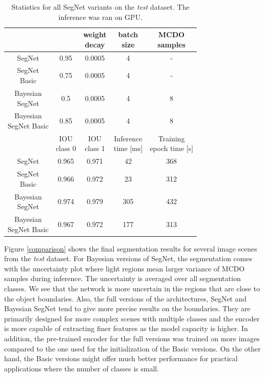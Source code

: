 \renewcommand{\arraystretch}{1.1}
\begin{table}[h]
	\centering	
	\begin{tabular}{|c|c|c|c|c|}
		\hline
		\thead{Architecture} & \thead{base\_lr} & \thead{weight \\ decay} & \thead{batch \\ size} & \thead{MCDO \\ samples}\\		
		\hline
		SegNet & 0.95 & 0.0005 & 4 & - \\
		\hline
		\makecell{SegNet \\ Basic} & 0.75 & 0.0005 & 4 & - \\
		\hline
		\makecell{Bayesian \\ SegNet} & 0.5 & 0.0005 & 4 & 8 \\	
		\hline
		\makecell{Bayesian \\ SegNet Basic} & 0.85 & 0.0005 & 4 & 8 \\
		\hline
		& \thead{IOU \\ class 0} & \thead{IOU \\ class 1} & \thead{Inference \\ time [ms] } & \thead{Training \\ epoch time [s] }\\		
		\hline	
		SegNet & 0.965 & 0.971 & 42 & 368 \\	
		\hline	
		\makecell{SegNet \\ Basic} & 0.966 & 0.972 & 23 & 312 \\	
		\hline	
		\makecell{Bayesian \\ SegNet} & 0.974 & 0.979 & 305 & 432 \\	
		\hline	
		\makecell{Bayesian \\ SegNet Basic} & 0.967 & 0.972 & 177 & 313 \\
		\hline
	\end{tabular}
	\vspace{10mm}
	\caption{Statistics for all SegNet variants on the \textit{test} dataset. The inference was ran on GPU.} 
	\label{tabulka}
\end{table}

Figure \ref{comparison} shows the final segmentation results for several image scenes from the \textit{test} dataset. For Bayesian versions of SegNet, the segmentation comes with the uncertainty plot where light regions mean larger variance of MCDO samples during inference. The uncertainty is averaged over all segmentation classes. We see that the network is more uncertain in the regions that are close to the object boundaries. Also, the full versions of the architectures, SegNet and Bayesian SegNet tend to give more precise results on the boundaries. They are primarily designed for more complex scenes with multiple classes and the encoder is more capable of extracting finer features as the model capacity is higher. In addition, the pre-trained encoder for the full versions was trained on more images compared to the one used for the initialization of the Basic versions. On the other hand, the Basic versions might offer much better performance for practical applications where the number of classes is small.

